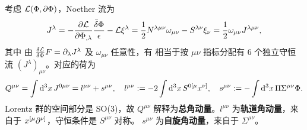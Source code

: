 考虑 $\mathcal{L}(\Phi,\partial\Phi)$，Noether 流为
\[
    J^\lambda = -\pdv{\mathcal{L}}{\Phi_{,\lambda}} \frac{\bar\var\Phi}{\epsilon}-\mathcal{L} \xi^\lambda = \frac12 N^{\lambda\mu\nu}\omega_{\mu\nu}-S^{\lambda\nu} \xi_\nu =  \frac 12\omega_{\mu\nu} J^{\lambda\mu\nu},
\]
其中
由 $\fdv{\Lag}{\Phi} F=\p_\lambda J^\lambda$ 及 $\omega_{\mu\nu}$ 任意性，有
相当于按 $\mu\nu$ 指标分配有 6 个独立守恒流 $(J^\lambda)_{\mu\nu}$。对应的荷为
\[
    Q^{\mu\nu} = \int\dd[3]{x} J^{0\mu\nu} = l^{\mu\nu} + s^{\mu\nu},\quad l^{\mu\nu} := -2\int\dd[3]{x}S^{0[\mu}x^{\nu]},\quad s^{\mu\nu} := -\int\dd[3]{x}\Pi\Sigma^{\mu\nu}\Phi.
\]
Lorentz 群的空间部分是 SO(3)，故 $Q^{\mu\nu}$ 解释为\textbf{总角动量}。$l^{\mu\nu}$ 为\textbf{轨道角动量}，来自于 $x^{[\mu}\partial^{\nu]}$，守恒条件是 $S^{\mu\nu}$ 对称。
$s^{\mu\nu}$ 为\textbf{自旋角动量}，来自于 $\Sigma^{\mu\nu}$。

